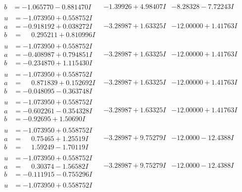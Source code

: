 \documentclass[1p]{elsarticle_modified}
\theoremstyle{definition}
\begin{document}
$$\begin{array}{c|c|c}
\begin{aligned}
b &= -1.065770 - 0.881470 I\end{aligned}
 & -1.39926 + 4.98407 I & -8.28328 - 7.72243 I \\ \hline\begin{aligned}
u &= -1.073950 + 0.558752 I \\
a &= -0.918192 + 0.038272 I \\
b &= \phantom{-}0.295211 + 0.810996 I\end{aligned}
 & -3.28987 + 1.63325 I & -12.00000 + 1.41763 I \\ \hline\begin{aligned}
u &= -1.073950 + 0.558752 I \\
a &= -0.408987 + 0.794851 I \\
b &= -0.234870 + 1.115430 I\end{aligned}
 & -3.28987 + 1.63325 I & -12.00000 + 1.41763 I \\ \hline\begin{aligned}
u &= -1.073950 + 0.558752 I \\
a &= \phantom{-}0.871839 + 0.152692 I \\
b &= -0.048095 - 0.363748 I\end{aligned}
 & -3.28987 + 1.63325 I & -12.00000 + 1.41763 I \\ \hline\begin{aligned}
u &= -1.073950 + 0.558752 I \\
a &= -0.602261 - 0.354328 I \\
b &= -0.92695 + 1.50690 I\end{aligned}
 & -3.28987 + 1.63325 I & -12.00000 + 1.41763 I \\ \hline\begin{aligned}
u &= -1.073950 + 0.558752 I \\
a &= \phantom{-}0.75465 + 1.25519 I \\
b &= \phantom{-}1.59249 - 1.70119 I\end{aligned}
 & -3.28987 + 9.75279 I & -12.0000 - 12.4388 I \\ \hline\begin{aligned}
u &= -1.073950 + 0.558752 I \\
a &= \phantom{-}0.30374 - 1.56582 I \\
b &= -0.111915 - 0.755296 I\end{aligned}
 & -3.28987 + 9.75279 I & -12.0000 - 12.4388 I \\ \hline\begin{aligned}
u &= -1.073950 + 0.558752 I \\

\end{aligned}
\end{array}$$
\end{document}
